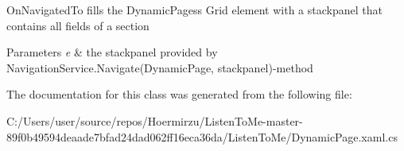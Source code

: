 On\+Navigated\+To fills the Dynamic\+Pages\textquotesingle{}s Grid element with a stackpanel that contains all fields of a section 


\begin{DoxyParams}{Parameters}
{\em e} & the stackpanel provided by Navigation\+Service.\+Navigate(\+Dynamic\+Page, stackpanel)-\/method\\
\hline
\end{DoxyParams}


The documentation for this class was generated from the following file\+:\begin{DoxyCompactItemize}
\item 
C\+:/\+Users/user/source/repos/\+Hoermirzu/\+Listen\+To\+Me-\/master-\/89f0b49594deaade7bfad24dad062ff16eca36da/\+Listen\+To\+Me/Dynamic\+Page.\+xaml.\+cs\end{DoxyCompactItemize}
